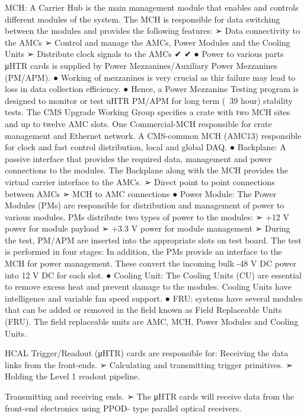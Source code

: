 MCH:
A \mtca Carrier Hub is the main management module that enables and
controls different modules of the \mtca system. The MCH is responsible for data
switching between the modules and provides the following features:
➢ Data connectivity to the AMCs
➢ Control and manage the AMCs, Power Modules and the Cooling Units
➢ Distribute clock signals to the AMCs
✔
✔
● Power
to various parts μHTR cards is supplied by Power
Mezzanines/Auxiliary Power Mezzanines (PM/APM).
● Working of mezzanines is very crucial as thir failure may lead to loss in
data collection efficiency.
● Hence, a Power Mezzanine Testing program is designed to monitor or test
uHTR PM/APM for long term (~39 hour) stability tests.
The CMS Upgrade Working Group specifies a \mtca crate with two MCH sites and
up to twelve AMC slots.
One Commercial-MCH responsible for crate management and Ethernet
network.
A CMS-common MCH (AMC13) responsible for clock and fast control
distribution, local and global DAQ.
● Backplane:
A passive interface that provides the required data, management and
power connections to the \mtca modules. The Backplane along with the MCH
provides the virtual carrier interface to the AMCs.
➢ Direct point to point connections between AMCs
➢ MCH to AMC connections
● Power
Module: The Power Modules (PMs) are responsible for distribution and
management of power to various \mtca modules. PMs distribute two types of power
to the \mtca modules:
➢ +12 V power for module payload
➢ +3.3 V power for module management
➢ During
the test, PM/APM are inserted into the appropriate slots on test
board. The test is performed in four stages:
In addition, the PMs provide an interface to the MCH for power management. These
convert the incoming bulk -48 V DC power into 12 V DC for each slot.
● Cooling
Unit: The Cooling Units (CU) are essential to remove excess heat and
prevent damage to the modules. Cooling Units have intelligence and variable fan
speed support.
● FRU:
\mtca systems have several modules that can be added or removed in the
field known as Field Replaceable Units (FRU). The field replaceable units are AMC,
MCH, Power Modules and Cooling Units.


HCAL Trigger/Readout (μHTR) cards are responsible for:
Receiving the data links from the front-ends.
➢ Calculating and transmitting trigger primitives.
➢ Holding the Level 1 readout pipeline.


Transmitting and receiving ends.
➢ The μHTR cards will receive
data from the front-end electronics using PPOD-
type parallel optical receivers.


